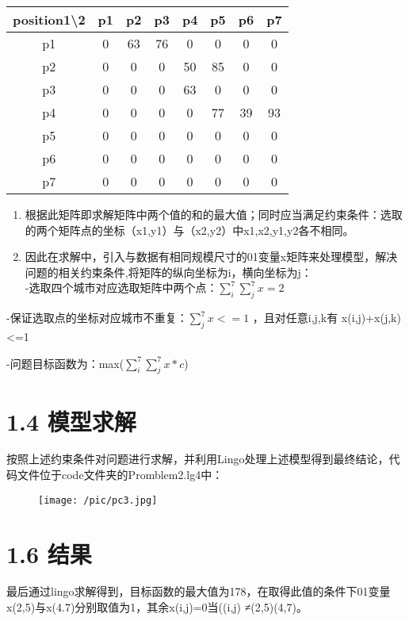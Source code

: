 \documentclass[bachelor,openany,oneside,color]{buaathesis}
\begin{document}
\begin{longtable}[]{@{}cccccccc@{}}
\toprule
position1\textbackslash2 & p1 & p2 & p3 & p4 & p5 & p6 &
p7\tabularnewline
\midrule
\endhead
p1 & 0 & 63 & 76 & 0 & 0 & 0 & 0\tabularnewline
p2 & 0 & 0 & 0 & 50 & 85 & 0 & 0\tabularnewline
p3 & 0 & 0 & 0 & 63 & 0 & 0 & 0\tabularnewline
p4 & 0 & 0 & 0 & 0 & 77 & 39 & 93\tabularnewline
p5 & 0 & 0 & 0 & 0 & 0 & 0 & 0\tabularnewline
p6 & 0 & 0 & 0 & 0 & 0 & 0 & 0\tabularnewline
p7 & 0 & 0 & 0 & 0 & 0 & 0 & 0\tabularnewline
\bottomrule
\end{longtable}

\begin{enumerate}
\def\labelenumi{\arabic{enumi}.}
\item
  根据此矩阵即求解矩阵中两个值的和的最大值；同时应当满足约束条件：选取的两个矩阵点的坐标（x1,y1）与（x2,y2）中x1,x2,y1,y2各不相同。
\item
  因此在求解中，引入与数据有相同规模尺寸的01变量x矩阵来处理模型，解决问题的相关约束条件,将矩阵的纵向坐标为i，横向坐标为j：\\
  -选取四个城市对应选取矩阵中两个点：\(\displaystyle \sum^7_{i}\sum^7_{j}{x}=2\)
\end{enumerate}

-保证选取点的坐标对应城市不重复：\(\displaystyle \sum^7_{j}{x}<=1\)
，且对任意i,j,k有 x(i,j)+x(j,k)\textless=1

-问题目标函数为：max(\(\displaystyle \sum^7_{i}\sum^7_{j}{x*c}\))

\hypertarget{header-n114}{%
\section{1.4 模型求解}\label{header-n114}}

按照上述约束条件对问题进行求解，并利用Lingo处理上述模型得到最终结论，代码文件位于code文件夹的Promblem2.lg4中：

\begin{figure}
\centering
\texttt{[image: /pic/pc3.jpg]}
\caption{}
\end{figure}

\hypertarget{header-n117}{%
\section{1.6 结果}\label{header-n117}}

最后通过lingo求解得到，目标函数的最大值为178，在取得此值的条件下01变量x(2,5)与x(4.7)分别取值为1，其余x(i,j)=0当((i,j)
≠(2,5)(4,7)。
\end{document}
